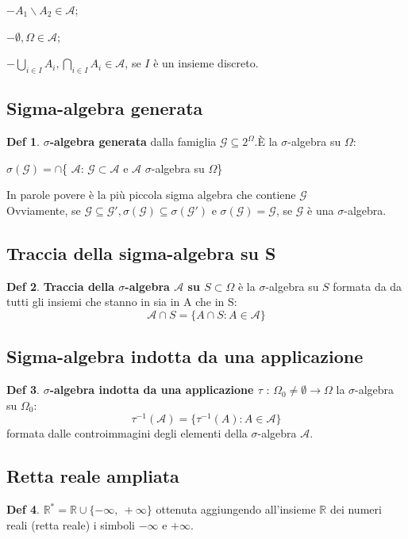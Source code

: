 \documentclass[a4paper,11pt]{article}
\theoremstyle{plain}
\theoremstyle{definition}
\newtheorem{defn}{Def}[section]
\theoremstyle{remark}
\begin{document}
$-A_{1}\backslash A_{2}\in \mathcal{A}$;

$-\emptyset, \Omega\in \mathcal{A}$;

$-\displaystyle \bigcup_{i\in I}A_{i}, \displaystyle \bigcap_{i\in I}A_{i}\in \mathcal{A}$, se $I$ \`{e} un insieme discreto.

\subsection{Sigma-algebra generata}

\begin{defn}
$\sigma$\textbf{-algebra generata} dalla famiglia $\mathcal{G}\subseteq 2^{\Omega}$.È la $\sigma$-algebra su $\Omega$:

$\sigma(\mathcal{G})=\cap$\{ $\mathcal{A}$: $\mathcal{G}\subset \mathcal{A}$ e $\mathcal{A}$  $\sigma$-algebra su $\Omega$\}
\end{defn}
In parole povere  è la più piccola sigma algebra che contiene $\mathcal{G}$ \\
Ovviamente, se $\mathcal{G}\subseteq \mathcal{G}',\sigma(\mathcal{G})\subseteq\sigma(\mathcal{G}')$  e $\sigma(\mathcal{G})=\mathcal{G}$, se $\mathcal{G}$ è una $\sigma$-algebra.

\subsection{Traccia della sigma-algebra su S}
\begin{defn}
\textbf{Traccia della $\sigma$-algebra $\mathcal{A}$ su $ S\subset\Omega$} è la $\sigma$-algebra su $S$ formata da da tutti gli insiemi che stanno in sia in A che in S:
$$
\mathcal{A}\cap S=\{A\cap S:A\in \mathcal{A}\}
$$
\end{defn}

\subsection{Sigma-algebra indotta da una applicazione}
\begin{defn}
\textbf{$\sigma$-algebra indotta da una applicazione $\tau$} : $\Omega_{0}\neq\emptyset \rightarrow \Omega$  la $\sigma$-algebra su $\Omega_{0}$:
$$
\tau^{-1}(\mathcal{A})=\{\tau^{-1}(A):A \in \mathcal{A}\}
$$
formata dalle controimmagini degli elementi della $\sigma$-algebra $\mathcal{A}.$
\end{defn}

\subsection{Retta reale ampliata}
\begin{defn}
$\mathbb{R}^{*}=\mathbb{R}\cup\{-\infty,\ +\infty\}$ ottenuta aggiungendo all'insieme $\mathbb{R}$ dei numeri reali
(retta reale) $\mathrm{i}$ simboli $-\infty$ e  $+\infty.$
\end{defn}
\end{document}
